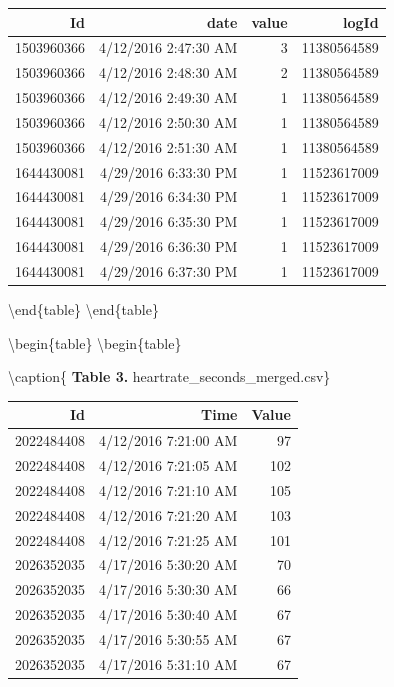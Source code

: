 \documentclass[
]{article}
\begin{document}
\begin{tabular}[t]{r|r|r|r}
\hline
Id & date & value & logId\\
\hline
1503960366 & 4/12/2016 2:47:30 AM & 3 & 11380564589\\
\hline
1503960366 & 4/12/2016 2:48:30 AM & 2 & 11380564589\\
\hline
1503960366 & 4/12/2016 2:49:30 AM & 1 & 11380564589\\
\hline
1503960366 & 4/12/2016 2:50:30 AM & 1 & 11380564589\\
\hline
1503960366 & 4/12/2016 2:51:30 AM & 1 & 11380564589\\
\hline
1644430081 & 4/29/2016 6:33:30 PM & 1 & 11523617009\\
\hline
1644430081 & 4/29/2016 6:34:30 PM & 1 & 11523617009\\
\hline
1644430081 & 4/29/2016 6:35:30 PM & 1 & 11523617009\\
\hline
1644430081 & 4/29/2016 6:36:30 PM & 1 & 11523617009\\
\hline
1644430081 & 4/29/2016 6:37:30 PM & 1 & 11523617009\\
\hline
\end{tabular}

\textbackslash end\{table\} \textbackslash end\{table\}

\textbackslash begin\{table\} \textbackslash begin\{table\}

\textbackslash caption\{\label{tab:unnamed-chunk-4} \textbf{Table 3.}
heartrate\_seconds\_merged.csv\} \centering

\begin{tabular}[t]{r|r|r}
\hline
Id & Time & Value\\
\hline
2022484408 & 4/12/2016 7:21:00 AM & 97\\
\hline
2022484408 & 4/12/2016 7:21:05 AM & 102\\
\hline
2022484408 & 4/12/2016 7:21:10 AM & 105\\
\hline
2022484408 & 4/12/2016 7:21:20 AM & 103\\
\hline
2022484408 & 4/12/2016 7:21:25 AM & 101\\
\hline
2026352035 & 4/17/2016 5:30:20 AM & 70\\
\hline
2026352035 & 4/17/2016 5:30:30 AM & 66\\
\hline
2026352035 & 4/17/2016 5:30:40 AM & 67\\
\hline
2026352035 & 4/17/2016 5:30:55 AM & 67\\
\hline
2026352035 & 4/17/2016 5:31:10 AM & 67\\
\hline
\end{tabular}
\end{document}
